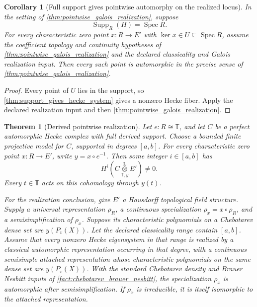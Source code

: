 \documentclass[11pt]{amsart}
\newtheorem{theorem}{Theorem}[section]
\newtheorem{corollary}[corollary]{Corollary}
\theoremstyle{definition}
\theoremstyle{remark}
\newcommand{\TT}{\mathbb T}
\newcommand{\Spec}{\operatorname{Spec}}
\newcommand{\Supp}{\operatorname{Supp}}
\begin{document}
\begin{corollary}[Full support gives pointwise automorphy on the realized locus]\label{cor:full_support_pointwise_automorphy}
In the setting of \cref{thm:pointwise_galois_realization}, suppose
\[
\Supp_R(H)=\Spec R.
\]
For every characteristic zero point \(x:R\to E'\) with \(\ker x\in U\subseteq\Spec R\), assume the coefficient topology and continuity hypotheses of \cref{thm:pointwise_galois_realization} and the declared classicality and Galois realization input. Then every such point is automorphic in the precise sense of \cref{thm:pointwise_galois_realization}.
\end{corollary}

\begin{proof}
Every point of \(U\) lies in the support, so \cref{thm:support_gives_hecke_system} gives a nonzero Hecke fiber. Apply the declared realization input and then \cref{thm:pointwise_galois_realization}.
\end{proof}

\begin{theorem}[Derived pointwise realization]\label{thm:derived_pointwise_realization}
Let \(e:R\cong\TT\), and let \(C\) be a perfect automorphic Hecke complex with full derived support. Choose a bounded finite projective model for \(C\), supported in degrees \([a,b]\). For every characteristic zero point \(x:R\to E'\), write \(y=x\circ e^{-1}\). Then some integer \(i\in[a,b]\) has
\[
H^i\left(C\mathbin{\mathop{\otimes}\limits_{\TT,y}^{\mathbf L}}E'\right)\neq0.
\]
Every \(t\in\TT\) acts on this cohomology through \(y(t)\).

For the realization conclusion, give \(E'\) a Hausdorff topological field structure. Supply a universal representation \(\rho_R\), a continuous specialization \(\rho_x=x\circ\rho_R\), and a semisimplification of \(\rho_x\). Suppose its characteristic polynomials on a Chebotarev dense set are \(y(P_v(X))\). Let the declared classicality range contain \([a,b]\). Assume that every nonzero Hecke eigensystem in that range is realized by a classical automorphic representation occurring in that degree, with a continuous semisimple attached representation whose characteristic polynomials on the same dense set are \(y(P_v(X))\). With the standard Chebotarev density and Brauer Nesbitt inputs of \cref{fact:chebotarev_brauer_nesbitt}, the specialization \(\rho_x\) is automorphic after semisimplification. If \(\rho_x\) is irreducible, it is itself isomorphic to the attached representation.
\end{theorem}
\end{document}
